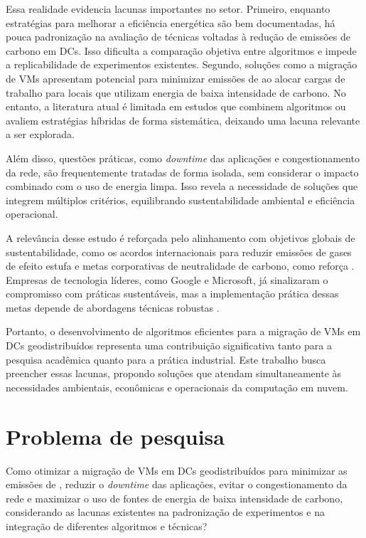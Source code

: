 \documentclass[
	12pt,				%
	oneside,			%
	a4paper,			%
	english,			%
	brazil				%
	]{abntex2ppgsi}
\begin{document}
Essa realidade evidencia lacunas importantes no setor. Primeiro, enquanto estratégias para melhorar a eficiência energética são bem documentadas, há pouca padronização na avaliação de técnicas voltadas à redução de emissões de carbono em DCs. Isso dificulta a comparação objetiva entre algoritmos e impede a replicabilidade de experimentos existentes. Segundo, soluções como a migração de VMs apresentam potencial para minimizar emissões de  ao alocar cargas de trabalho para locais que utilizam energia de baixa intensidade de carbono. No entanto, a literatura atual é limitada em estudos que combinem algoritmos ou avaliem estratégias híbridas de forma sistemática, deixando uma lacuna relevante a ser explorada.

Além disso, questões práticas, como \textit{downtime} das aplicações e congestionamento da rede, são frequentemente tratadas de forma isolada, sem considerar o impacto combinado com o uso de energia limpa. Isso revela a necessidade de soluções que integrem múltiplos critérios, equilibrando sustentabilidade ambiental e eficiência operacional.

A relevância desse estudo é reforçada pelo alinhamento com objetivos globais de sustentabilidade, como os acordos internacionais para reduzir emissões de gases de efeito estufa e metas corporativas de neutralidade de carbono, como reforça . Empresas de tecnologia líderes, como Google e Microsoft, já sinalizaram o compromisso com práticas sustentáveis, mas a implementação prática dessas metas depende de abordagens técnicas robustas \cite{Google_Microsoft_Climate_Change}.

Portanto, o desenvolvimento de algoritmos eficientes para a migração de VMs em DCs geodistribuídos representa uma contribuição significativa tanto para a pesquisa acadêmica quanto para a prática industrial. Este trabalho busca preencher essas lacunas, propondo soluções que atendam simultaneamente às necessidades ambientais, econômicas e operacionais da computação em nuvem.

\section{Problema de pesquisa}
Como otimizar a migração de VMs em DCs geodistribuídos para minimizar as emissões de , reduzir o \textit{downtime} das aplicações, evitar o congestionamento da rede e maximizar o uso de fontes de energia de baixa intensidade de carbono, considerando as lacunas existentes na padronização de experimentos e na integração de diferentes algoritmos e técnicas?
\end{document}
